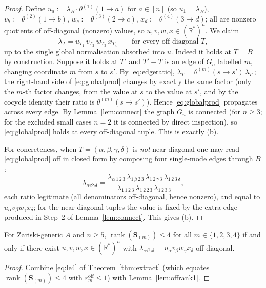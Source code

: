 \begin{proof}
Define $u_a:=\lambda_{B}\cdot\theta^{(1)}(1\to a)$ for $a\in[n]$ (so $u_1=\lambda_B$),
$v_b:=\theta^{(2)}(1\to b)$, $w_c:=\theta^{(3)}(2\to c)$, $x_d:=\theta^{(4)}(3\to d)$; all are
nonzero quotients of off-diagonal (nonzero) values, so $u,v,w,x\in(\mathbb R^*)^n$. We claim
\begin{equation}\label{eq:globalprod}
\lambda_{T}=u_{T_1}\,v_{T_2}\,w_{T_3}\,x_{T_4}\qquad\text{for every off-diagonal }T,
\end{equation}
up to the single global normalisation absorbed into $u$. Indeed it holds at $T=B$ by
construction. Suppose it holds at $T'$ and $T'\!-\!T$ is an edge of $G_n$ labelled $m$,
changing coordinate $m$ from $s$ to $s'$. By \eqref{eq:edgeratio},
$\lambda_T=\theta^{(m)}(s\to s')\,\lambda_{T'}$; the right-hand side of \eqref{eq:globalprod}
changes by exactly the same factor (only the $m$-th factor changes, from the value at $s$ to
the value at $s'$, and by the cocycle identity their ratio is $\theta^{(m)}(s\to s')$).
Hence \eqref{eq:globalprod} propagates across every edge. By Lemma~\ref{lem:connect} the
graph $G_n$ is connected (for $n\ge3$; for the excluded small cases $n=2$ it is connected by
direct inspection), so \eqref{eq:globalprod} holds at every off-diagonal tuple. This is
exactly (b).

\medskip
For concreteness, when $T=(\alpha,\beta,\gamma,\delta)$ is \emph{not} near-diagonal one may
read \eqref{eq:globalprod} off in closed form by composing four single-mode edges through
$B$:
\[
\lambda_{\alpha\beta\gamma\delta}
=\frac{\lambda_{\alpha\,1\,2\,3}\,\lambda_{1\,\beta\,2\,3}\,\lambda_{1\,2\,\gamma\,3}\,
\lambda_{1\,2\,3\,\delta}}{\lambda_{1\,1\,2\,3}\,\lambda_{1\,2\,2\,3}\,\lambda_{1\,2\,3\,3}},
\]
each ratio legitimate (all denominators off-diagonal, hence nonzero), and equal to
$u_\alpha v_\beta w_\gamma x_\delta$; for the near-diagonal tuples the value is fixed by the
extra edge produced in Step~2 of Lemma~\ref{lem:connect}. This gives
(b).
\end{proof}

\begin{theorem}[Characterisation]\label{thm:char}
For Zariski-generic $A$ and $n\ge5$, $\operatorname{rank}(\mathbf S_{(m)})\le4$ for all
$m\in\{1,2,3,4\}$ if and only if there exist $u,v,w,x\in(\mathbb R^*)^n$ with
$\lambda_{\alpha\beta\gamma\delta}=u_\alpha v_\beta w_\gamma x_\delta$ off-diagonal.
\end{theorem}

\begin{proof}
Combine \eqref{eq:le4} of Theorem~\ref{thm:extract} (which equates
$\operatorname{rank}(\mathbf S_{(m)})\le4$ with $r_m^{\mathrm{off}}\le1$) with
Lemma~\ref{lem:offrank1}.
\end{proof}

